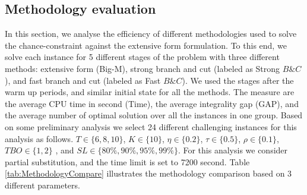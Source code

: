 \documentclass[10pt]{article}
\newcommand{\Ti}{T}
\newcommand{\Ka}{K}
\newcommand{\Bi}{B} %
\newcommand{\Vi}{v} %
\begin{document}
\subsection{Methodology evaluation}
In this section, we analyse the efficiency of different methodologies used to solve the chance-constraint against the extensive form formulation. To this end, we solve each instance for 5 different stages of the problem with three different methods: extensive form (Big-M), strong branch and cut (labeled as Strong $B\& C$), and fast branch and cut (labeled as Fast $B\&C$). We used the stages after the warm up periods, and similar initial state for all the methods. 
The measure are the average CPU time in second (Time), the average integrality gap (GAP), and the average number of optimal solution over all the instances in one group. Based on some preliminary analysis we select 24 different challenging instances for this analysis as follows. $\Ti \in \{  6, 8 , 10\}$, $\Ka \in \{ 10 \}$,
$\eta \in \{  0.2 \} $,
$\tau \in \{0.5 \}$,
$\rho \in \{ 0.1 \} $,
$ TBO \in \{1, 2\} $ , and
$ SL\in \{80\%, 90\%, 95\%, 99\% \} $. For this analysis we consider partial substitution, and the time limit is set to 7200 second.
Table \ref{tab:MethodologyCompare} illustrates the methodology comparison based on 3 different parameters. 
\end{document}
